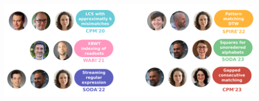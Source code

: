 
\begin{frame}
    \vspace{1cm}

    \includegraphics[width=\textwidth]{pictures/mindmap/co_auth.png}
\end{frame}

